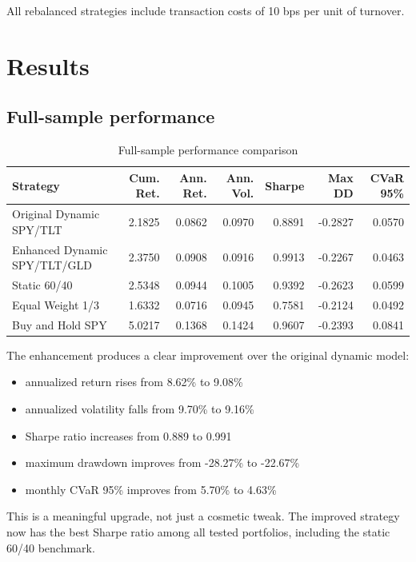 \documentclass[11pt]{article}
\begin{document}
All rebalanced strategies include transaction costs of 10 bps per unit of turnover.

\section{Results}
\subsection{Full-sample performance}
\begin{table}[H]
\centering
\caption{Full-sample performance comparison}
\small
\begin{tabular}{>{\raggedright\arraybackslash}p{4.3cm}rrrrrr}
\toprule
Strategy & Cum. Ret. & Ann. Ret. & Ann. Vol. & Sharpe & Max DD & CVaR 95\% \\
\midrule
Original Dynamic SPY/TLT & 2.1825 & 0.0862 & 0.0970 & 0.8891 & -0.2827 & 0.0570 \\
Enhanced Dynamic SPY/TLT/GLD & 2.3750 & 0.0908 & 0.0916 & 0.9913 & -0.2267 & 0.0463 \\
Static 60/40 & 2.5348 & 0.0944 & 0.1005 & 0.9392 & -0.2623 & 0.0599 \\
Equal Weight 1/3 & 1.6332 & 0.0716 & 0.0945 & 0.7581 & -0.2124 & 0.0492 \\
Buy and Hold SPY & 5.0217 & 0.1368 & 0.1424 & 0.9607 & -0.2393 & 0.0841 \\
\bottomrule
\end{tabular}
\end{table}

The enhancement produces a clear improvement over the original dynamic model:
\begin{itemize}
    \item annualized return rises from 8.62\% to 9.08\%
    \item annualized volatility falls from 9.70\% to 9.16\%
    \item Sharpe ratio increases from 0.889 to 0.991
    \item maximum drawdown improves from -28.27\% to -22.67\%
    \item monthly CVaR 95\% improves from 5.70\% to 4.63\%
\end{itemize}

This is a meaningful upgrade, not just a cosmetic tweak. The improved strategy now has the best Sharpe ratio among all tested portfolios, including the static 60/40 benchmark.
\end{document}
